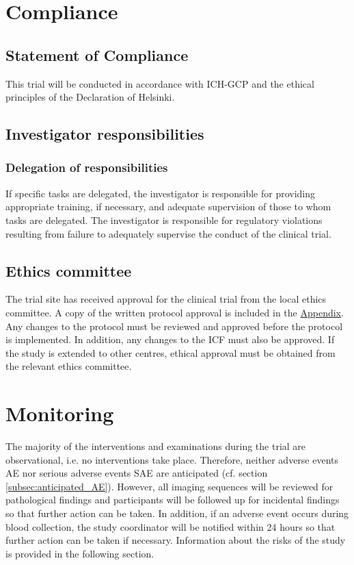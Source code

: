 \section{Compliance}
\subsection{Statement of Compliance}
This trial will be conducted in accordance with ICH-GCP and the ethical principles of the Declaration of Helsinki.

\subsection{Investigator responsibilities}

\subsubsection{Delegation of responsibilities}
If specific tasks are delegated, the investigator is responsible for providing appropriate training, if necessary, and adequate supervision of those to whom tasks are delegated. The investigator is responsible for regulatory violations resulting from failure to adequately supervise the conduct of the clinical trial.

\subsection{Ethics committee}
The trial site has received approval for the clinical trial from the local ethics committee. A copy of the written protocol approval is included in the \hyperref[chap:appendix]{Appendix}. Any changes to the protocol must be reviewed and approved before the protocol is implemented. In addition, any changes to the \ac{ICF} must also be approved. If the study is extended to other centres, ethical approval must be obtained from the relevant ethics committee.

\section{Monitoring}
The majority of the interventions and examinations during the trial are observational, i.e. no interventions take place. Therefore, neither adverse events \ac{AE} nor serious adverse events \ac{SAE} are anticipated (cf. section \ref{subsec:anticipated_AE}). However, all imaging sequences will be reviewed for pathological findings and participants will be followed up for incidental findings so that further action can be taken. In addition, if an adverse event occurs during blood collection, the study coordinator will be notified within 24 hours so that further action can be taken if necessary. Information about the risks of the study is provided in the following section.

